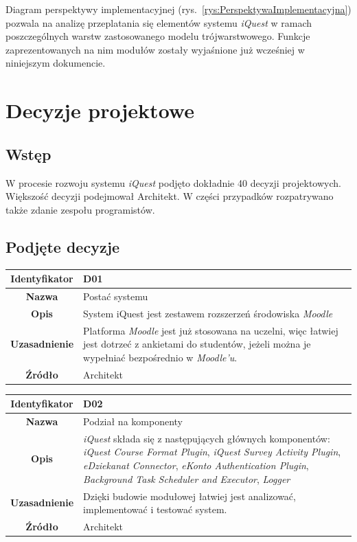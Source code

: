 Diagram perspektywy implementacyjnej (rys.~\ref{rys:PerspektywaImplementacyjna}) pozwala na analizę przeplatania się elementów systemu \textit{iQuest} w ramach poszczególnych warstw zastosowanego modelu trójwarstwowego. Funkcje zaprezentowanych na nim modułów zostały wyjaśnione już wcześniej w niniejszym dokumencie.

\section{Decyzje projektowe}
\label{Chapter55}

\subsection{Wstęp}
\label{Chapter551}

W procesie rozwoju systemu \textit{iQuest} podjęto dokładnie 40 decyzji projektowych. Większość decyzji podejmował Architekt. W części przypadków rozpatrywano także zdanie zespołu programistów.

\subsection{Podjęte decyzje}
\label{Chapter552}

\begin{table}[H]
\centering
\begin{tabular}{ | >{\bfseries}c | p{11cm} | }
\hline
%
Identyfikator & D01 \\ \hline
Nazwa & Postać systemu \\ \hline
Opis & System iQuest jest zestawem rozszerzeń środowiska \textit{Moodle} \\ \hline
Uzasadnienie & Platforma \textit{Moodle} jest już stosowana na uczelni, więc łatwiej jest dotrzeć z ankietami do studentów, jeżeli można je wypełniać bezpośrednio w \textit{Moodle'u}. \\ \hline
Źródło & Architekt \\ \hline
%
\end{tabular}
\end{table}

\begin{table}[H]
\centering
\begin{tabular}{ | >{\bfseries}c | p{11cm} | }
\hline
%
Identyfikator & D02 \\ \hline
Nazwa & Podział na komponenty  \\ \hline
Opis & \textit{iQuest} składa się z następujących głównych komponentów: \textit{iQuest Course Format Plugin}, \textit{iQuest Survey Activity Plugin}, \textit{eDziekanat Connector}, \textit{eKonto Authentication Plugin}, \textit{Background Task Scheduler and Executor}, \textit{Logger}  \\ \hline
Uzasadnienie & Dzięki budowie modułowej łatwiej jest analizować, implementować i testować system. \\ \hline
Źródło & Architekt \\ \hline
%
\end{tabular}
\end{table}

